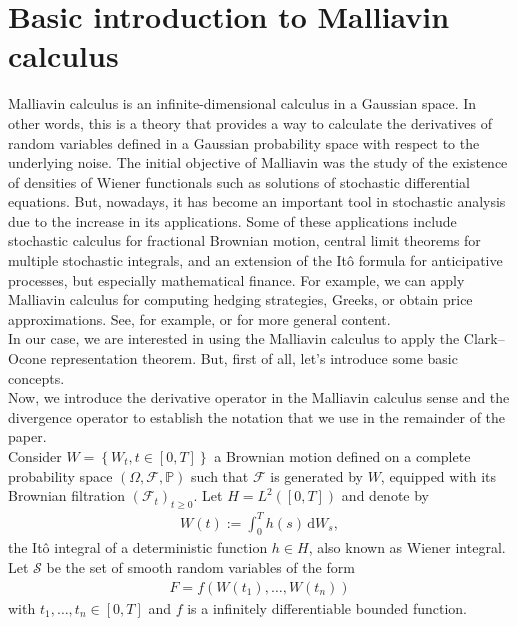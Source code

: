 \documentclass[a4paper,10pt]{article}
\renewcommand{\d}{\,\mathrm{d}}
\newcommand{\1}{\mathbf{1}}
\begin{document}
\section{Basic introduction to Malliavin calculus}\label{sec:Malliavin}
Malliavin calculus is an infinite-dimensional calculus in a Gaussian space. In other words, this is a theory that provides a way to calculate the derivatives of random variables defined in a Gaussian probability space with respect to the underlying noise. The initial objective of Malliavin was the study of the existence of densities of Wiener functionals such as solutions of stochastic differential equations. But, nowadays, it has become an important tool in stochastic analysis due to the increase in its applications. Some of these applications include stochastic calculus for fractional Brownian motion, central limit theorems for multiple stochastic integrals, and an extension of the Itô formula for anticipative processes, but especially mathematical finance. For example, we can apply Malliavin calculus for computing hedging strategies, Greeks, or obtain price approximations. See, for example, \cite{AlosLorite} or \cite{Nualart} for more general content.\\

In our case, we are interested in using the Malliavin calculus to apply the Clark–Ocone representation theorem. But, first of all, let's introduce some basic concepts.\\ 

Now, we introduce the derivative operator in the Malliavin calculus sense and the divergence operator to establish the notation that we use in the remainder of the paper.\\

Consider $W=\left\{W_{t}, t\in \left[0,T\right]\right\}$ a Brownian motion defined on a complete probability space $\left(\Omega, \mathcal{F}, \mathbb{P}\right)$ such that  $\mathcal{F}$ is generated by $W$, equipped with its Brownian filtration $(\mathcal{F}_{t})_{t\geq0}$. Let $H=L^{2}(\left[0,T\right])$ and denote by 
\begin{eqnarray*}
W(t) := \int^{T}_{0} h(s) \d W_{s},
\end{eqnarray*}
the It\^o integral of a deterministic function $h \in H$, also known as Wiener integral. Let $\mathcal{S}$ be the set of smooth random variables of the form
\begin{eqnarray*}
F=f\left(W(t_{1}), \ldots, W(t_{n})\right)
\end{eqnarray*}
with $t_{1}, \ldots, t_{n} \in \left[0,T\right]$ and $f$ is a infinitely differentiable bounded function.
\end{document}

